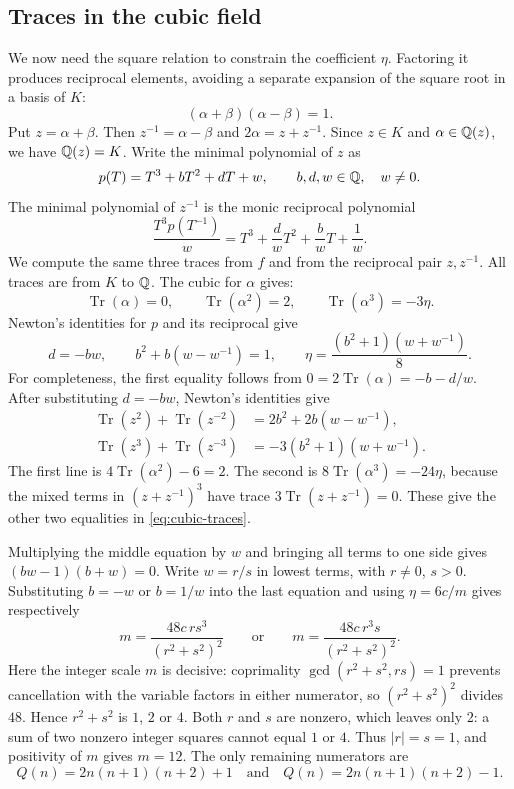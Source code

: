 \documentclass[11pt]{article}
\begin{document}
\subsection{Traces in the cubic field}\label{sec:cubic-trace}
We now need the square relation to constrain the coefficient $\eta$.
Factoring it produces reciprocal elements, avoiding a separate expansion
of the square root in a basis of $K$:
\[
 (\alpha+\beta)(\alpha-\beta)=1.
\]
Put $z=\alpha+\beta$. Then $z^{-1}=\alpha-\beta$ and
$2\alpha=z+z^{-1}$. Since $z\in K$ and $\alpha\in\mathbb{Q}(z)$, we have
$\mathbb{Q}(z)=K$. Write the minimal polynomial of $z$ as
\[
 p(T)=T^3+bT^2+dT+w,\qquad b,d,w\in\mathbb{Q},\quad w\ne0.
\]
The minimal polynomial of $z^{-1}$ is the monic reciprocal polynomial
\[
 \frac{T^3p(T^{-1})}{w}
   =T^3+\frac dwT^2+\frac bwT+\frac1w.
\]
We compute the same three traces from $f$ and from the reciprocal
pair $z,z^{-1}$. All traces are from $K$ to $\mathbb{Q}$. The cubic for
$\alpha$ gives:
\[
 \operatorname{Tr}(\alpha)=0,\qquad
 \operatorname{Tr}(\alpha^2)=2,\qquad
 \operatorname{Tr}(\alpha^3)=-3\eta.
\]
Newton's identities for $p$ and its reciprocal give
\begin{equation}\label{eq:cubic-traces}
 d=-bw,\qquad b^2+b(w-w^{-1})=1,\qquad
 \eta=\frac{(b^2+1)(w+w^{-1})}{8}.
\end{equation}
For completeness, the first equality follows from
$0=2\operatorname{Tr}(\alpha)=-b-d/w$. After substituting $d=-bw$,
Newton's identities give
\[
 \begin{aligned}
 \operatorname{Tr}(z^2)+\operatorname{Tr}(z^{-2})
   &=2b^2+2b(w-w^{-1}),\\
 \operatorname{Tr}(z^3)+\operatorname{Tr}(z^{-3})
   &=-3(b^2+1)(w+w^{-1}).
 \end{aligned}
\]
The first line is $4\operatorname{Tr}(\alpha^2)-6=2$.
The second is $8\operatorname{Tr}(\alpha^3)=-24\eta$, because the
mixed terms in $(z+z^{-1})^3$ have trace
$3\operatorname{Tr}(z+z^{-1})=0$. These give the other two equalities
in \eqref{eq:cubic-traces}.

Multiplying the middle equation by $w$ and bringing all terms to one
side gives $(bw-1)(b+w)=0$. Write $w=r/s$ in
lowest terms, with $r\ne0$, $s>0$. Substituting $b=-w$ or $b=1/w$
into the last equation and using $\eta=6c/m$ gives respectively
\[
 m=\frac{48c\,r s^3}{(r^2+s^2)^2}
 \qquad\text{or}\qquad
 m=\frac{48c\,r^3s}{(r^2+s^2)^2}.
\]
Here the integer scale $m$ is decisive: coprimality
$\gcd(r^2+s^2,rs)=1$ prevents cancellation with the variable factors
in either numerator, so $(r^2+s^2)^2$ divides $48$. Hence $r^2+s^2$ is $1$, $2$ or $4$.
Both $r$ and $s$ are nonzero, which leaves only $2$: a sum of two
nonzero integer squares cannot equal $1$ or $4$.
Thus $|r|=s=1$, and positivity of $m$ gives $m=12$.
The only remaining numerators are
\[
 Q(n)=2n(n+1)(n+2)+1
 \quad\text{and}\quad
 Q(n)=2n(n+1)(n+2)-1.
\]
\end{document}
